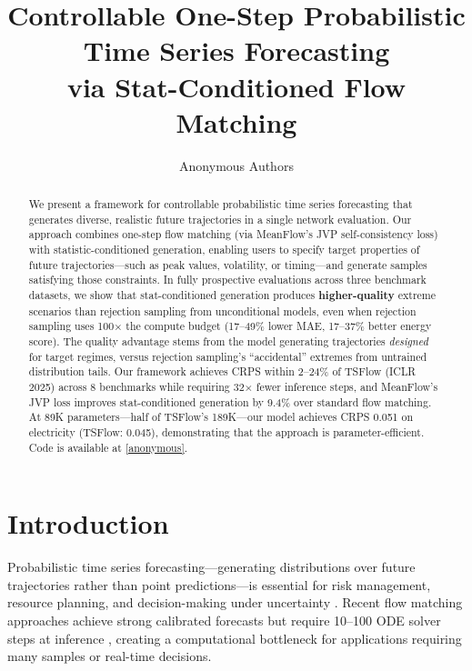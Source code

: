 \documentclass{article}
\title{Controllable One-Step Probabilistic Time Series Forecasting\\via Stat-Conditioned Flow Matching}
\author{
  Anonymous Authors
}
\begin{document}
\maketitle

\begin{abstract}
We present a framework for controllable probabilistic time series forecasting that generates diverse, realistic future trajectories in a single network evaluation. Our approach combines one-step flow matching (via MeanFlow's JVP self-consistency loss) with statistic-conditioned generation, enabling users to specify target properties of future trajectories---such as peak values, volatility, or timing---and generate samples satisfying those constraints. In fully prospective evaluations across three benchmark datasets, we show that stat-conditioned generation produces \textbf{higher-quality} extreme scenarios than rejection sampling from unconditional models, even when rejection sampling uses 100$\times$ the compute budget (17--49\% lower MAE, 17--37\% better energy score). The quality advantage stems from the model generating trajectories \emph{designed} for target regimes, versus rejection sampling's ``accidental'' extremes from untrained distribution tails. Our framework achieves CRPS within 2--24\% of TSFlow (ICLR 2025) across 8 benchmarks while requiring 32$\times$ fewer inference steps, and MeanFlow's JVP loss improves stat-conditioned generation by 9.4\% over standard flow matching. At 89K parameters---half of TSFlow's 189K---our model achieves CRPS 0.051 on electricity (TSFlow: 0.045), demonstrating that the approach is parameter-efficient. Code is available at \url{[anonymous]}.
\end{abstract}

\section{Introduction}

Probabilistic time series forecasting---generating distributions over future trajectories rather than point predictions---is essential for risk management, resource planning, and decision-making under uncertainty \citep{salinas2020deepar, kollovieh2024tsflow}. Recent flow matching approaches achieve strong calibrated forecasts but require 10--100 ODE solver steps at inference \citep{kollovieh2024tsflow, flmts2024}, creating a computational bottleneck for applications requiring many samples or real-time decisions.
\end{document}
